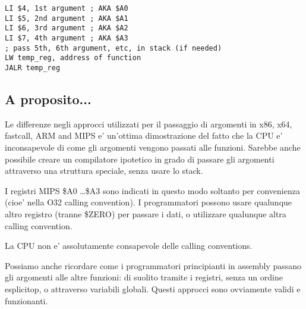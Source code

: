 \begin{lstlisting}[caption=MIPS (O32 calling convention)]
LI $4, 1st argument ; AKA $A0
LI $5, 2nd argument ; AKA $A1
LI $6, 3rd argument ; AKA $A2
LI $7, 4th argument ; AKA $A3
; pass 5th, 6th argument, etc, in stack (if needed)
LW temp_reg, address of function
JALR temp_reg
\end{lstlisting}

\subsection{A proposito...}

Le differenze negli approcci utilizzati per il passaggio di argomenti in x86, x64, 
fastcall, ARM and MIPS e' un'ottima dimostrazione del fatto che la CPU e' inconsapevole di come gli argomenti vengono passati alle funzioni. 
Sarebbe anche possibile creare un compilatore ipotetico in grado di passare gli argomenti attraverso una struttura speciale, senza usare lo stack.

I registri MIPS \$A0 \dots \$A3 sono indicati in questo modo soltanto per convenienza (cioe' nella O32 calling convention).
I programmatori possono usare qualunque altro registro (tranne \$ZERO) per passare i dati, o utilizzare qualunque altra calling convention. 

La \ac{CPU} non e' assolutamente consapevole delle calling conventions.

Possiamo anche ricordare come i programmatori principianti in assembly passano gli argomenti alle altre funzioni: 
di suolito tramite i registri, senza un ordine esplicitop, o attraverso variabili globali.
Questi approcci sono ovviamente validi e funzionanti.
